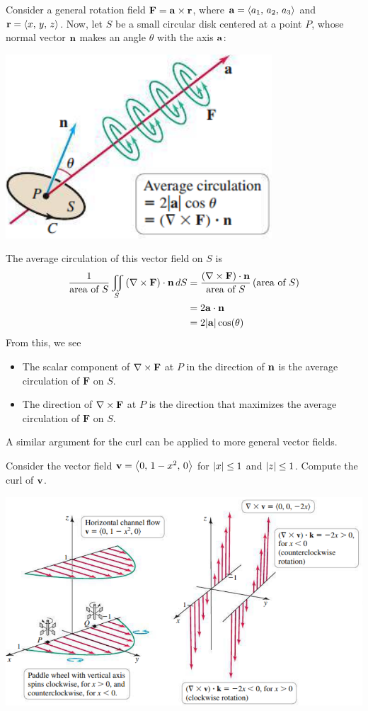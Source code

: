 \documentclass[mathNotesPreamble]{subfiles}
\begin{document}
  Consider a general rotation field $\mathbf F={\mathbf{a}}\times{\mathbf{r}}$, where ${\mathbf{a}}={\left\langle a_1,\,a_2,\,a_3 \right\rangle}$ and ${\mathbf{r}}={\left\langle x,\,y,\,z \right\rangle}$. Now, let $S$ be a small circular disk centered at a point $P$, whose normal vector ${\mathbf{n}}$ makes an angle $\theta$ with the axis ${\mathbf{a}}$:
  \begin{center}
    \includegraphics[width=0.4\linewidth]{images/briggs_17_07/fig17_64}
  \end{center}
  The average circulation of this vector field on $S$ is
  \begin{align*}
    \frac{1}{\textnormal{area of }S} \iint\limits_S {\left(\nabla\times\mathbf F\right)}\cdot{\mathbf{n}}\,dS
      &=\frac{{\left(\nabla\times\mathbf F\right)}\cdot{\mathbf{n}}}{\textnormal{area of }S} \,{\left(\textnormal{area of }S\right)}\\
      &=2{\mathbf{a}}\cdot{\mathbf{n}}\\
      &=2{\left\vert{\mathbf{a}}\right\vert}\cos(\theta)
  \end{align*}
  From this, we see
  \begin{itemize}
    \item The scalar component of $\nabla\times\mathbf F$ at $P$ in the direction of ${\mathbf{n}}$ is the average circulation of $\mathbf F$ on $S$.
    \item The direction of $\nabla\times\mathbf F$ at $P$ is the direction that maximizes the average circulation of $\mathbf F$ on $S$.
  \end{itemize}
  A similar argument for the curl can be applied to more general vector fields.
  \pagebreak

  \begin{ex*}
    Consider the vector field ${\mathbf{v}}={\left\langle 0,\,1-x^2,\,0 \right\rangle}$ for ${\left\vert x\right\vert}\leq 1$ and ${\left\vert z\right\vert}\leq 1$. Compute the curl of ${\mathbf{v}}$.
  \end{ex*}
  \begin{center}
    \includegraphics[width=0.75\linewidth]{images/briggs_17_07/fig17_65}
  \end{center}
  \pagebreak
\end{document}
